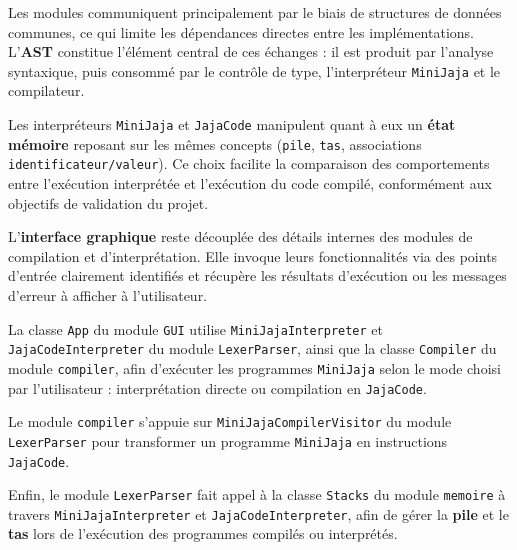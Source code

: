 Les modules communiquent principalement par le biais de structures de données communes, ce qui limite les dépendances directes entre les implémentations. L’\textbf{AST} constitue l’élément central de ces échanges : il est produit par l’analyse syntaxique, puis consommé par le contrôle de type, l’interpréteur \texttt{MiniJaja} et le compilateur.

Les interpréteurs \texttt{MiniJaja} et \texttt{JajaCode} manipulent quant à eux un \textbf{état mémoire} reposant sur les mêmes concepts (\texttt{pile}, \texttt{tas}, associations \texttt{identificateur/valeur}). Ce choix facilite la comparaison des comportements entre l’exécution interprétée et l’exécution du code compilé, conformément aux objectifs de validation du projet.

\vspace{0.5cm}
L’\textbf{interface graphique} reste découplée des détails internes des modules de compilation et d’interprétation. Elle invoque leurs fonctionnalités via des points d’entrée clairement identifiés et récupère les résultats d’exécution ou les messages d’erreur à afficher à l’utilisateur.

\vspace{0.5cm}
La classe \texttt{App} du module \texttt{GUI} utilise \texttt{MiniJajaInterpreter} et \texttt{JajaCodeInterpreter} du module \texttt{LexerParser}, ainsi que la classe \texttt{Compiler} du module \texttt{compiler}, afin d’exécuter les programmes \texttt{MiniJaja} selon le mode choisi par l’utilisateur : interprétation directe ou compilation en \texttt{JajaCode}.

Le module \texttt{compiler} s’appuie sur \texttt{MiniJajaCompilerVisitor} du module \texttt{LexerParser} pour transformer un programme \texttt{MiniJaja} en instructions \texttt{JajaCode}.

Enfin, le module \texttt{LexerParser} fait appel à la classe \texttt{Stacks} du module \texttt{memoire} à travers \texttt{MiniJajaInterpreter} et \texttt{JajaCodeInterpreter}, afin de gérer la \textbf{pile} et le \textbf{tas} lors de l’exécution des programmes compilés ou interprétés.
